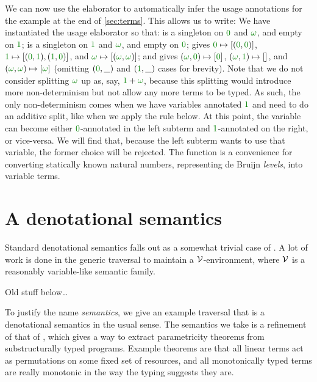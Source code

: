 We can now use the elaborator to automatically infer the usage
annotations for the example at the end of \cref{sec:terms}. This
allows us to write:
We have instantiated the usage elaborator so that:
 is a singleton on $\gr0$ and $\gr\omega$, and
empty on $\gr1$;  is a singleton on $\gr1$ and
$\gr\omega$, and empty on $\gr0$;  gives $\gr0
\mapsto [(\gr0,\gr0)]$, $\gr1 \mapsto [(\gr0,\gr1),(\gr1,\gr0)]$, and
$\gr\omega \mapsto [(\gr\omega,\gr\omega)]$; and 
gives $(\gr\omega, \gr0) \mapsto [\gr0]$, $(\gr\omega, \gr1) \mapsto
[]$, and $(\gr\omega, \gr\omega) \mapsto [\gr\omega]$ (omitting
$(\gr0, \_)$ and $(\gr1, \_)$ cases for brevity). Note that we do not
consider splitting $\gr\omega$ up as, say, $\gr1 + \gr\omega$, because
this splitting would introduce more non-determinism but not allow any
more terms to be typed. As such, the only non-determinism comes when
we have variables annotated $\gr1$ and need to do an additive split,
like when we apply the  rule below. At
this point, the variable can become either $\gr0$-annotated in the
left subterm and $\gr1$-annotated on the right, or vice-versa. We will
find that, because the left subterm wants to use that variable, the
former choice will be rejected. The function  is a
convenience for converting statically known natural numbers,
representing de Bruijn \emph{levels}, into variable terms.


\section{A denotational semantics}\label{sec:den-sem}

Standard denotational semantics falls out as a somewhat trivial case of
.
A lot of work is done in the generic traversal  to
maintain a $\mathcal V$-environment, where $\mathcal V$ is a reasonably variable-like semantic
family.

{\color{red}Old stuff below\ldots}

To justify the name \emph{semantics}, we give an example traversal that is a
denotational semantics in the usual sense.
The semantics we take is a refinement of that of \citet{AbelBernardy2020},
which gives a way to extract parametricity theorems from substructurally typed
programs.
Example theorems are that all linear terms act as permutations on some fixed
set of resources, and all monotonically typed terms are really monotonic in the
way the typing suggests they are.

